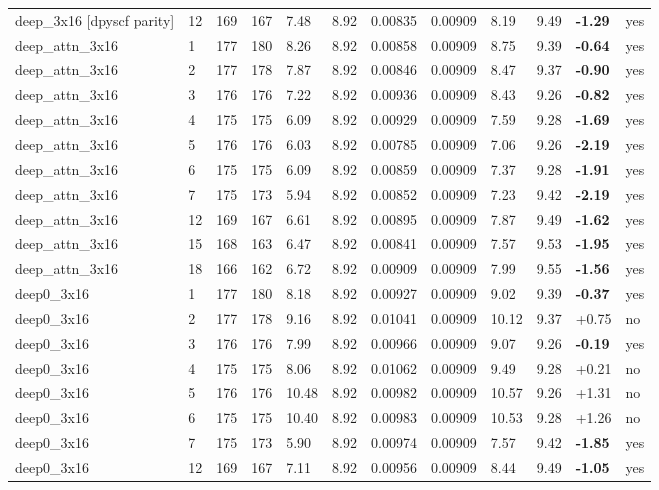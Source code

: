 \documentclass[10pt,a4paper]{article}
\begin{document}
\begin{landscape}
\begin{scriptsize}
\begin{longtable}{llllllllllll}
deep\_3x16 [dpyscf parity] & 12 & 169 & 167 & 7.48 & 8.92 & 0.00835 & 0.00909 & 8.19 & 9.49 & \textbf{-1.29} & yes \\
deep\_attn\_3x16 & 1 & 177 & 180 & 8.26 & 8.92 & 0.00858 & 0.00909 & 8.75 & 9.39 & \textbf{-0.64} & yes \\
deep\_attn\_3x16 & 2 & 177 & 178 & 7.87 & 8.92 & 0.00846 & 0.00909 & 8.47 & 9.37 & \textbf{-0.90} & yes \\
deep\_attn\_3x16 & 3 & 176 & 176 & 7.22 & 8.92 & 0.00936 & 0.00909 & 8.43 & 9.26 & \textbf{-0.82} & yes \\
deep\_attn\_3x16 & 4 & 175 & 175 & 6.09 & 8.92 & 0.00929 & 0.00909 & 7.59 & 9.28 & \textbf{-1.69} & yes \\
deep\_attn\_3x16 & 5 & 176 & 176 & 6.03 & 8.92 & 0.00785 & 0.00909 & 7.06 & 9.26 & \textbf{-2.19} & yes \\
deep\_attn\_3x16 & 6 & 175 & 175 & 6.09 & 8.92 & 0.00859 & 0.00909 & 7.37 & 9.28 & \textbf{-1.91} & yes \\
deep\_attn\_3x16 & 7 & 175 & 173 & 5.94 & 8.92 & 0.00852 & 0.00909 & 7.23 & 9.42 & \textbf{-2.19} & yes \\
deep\_attn\_3x16 & 12 & 169 & 167 & 6.61 & 8.92 & 0.00895 & 0.00909 & 7.87 & 9.49 & \textbf{-1.62} & yes \\
deep\_attn\_3x16 & 15 & 168 & 163 & 6.47 & 8.92 & 0.00841 & 0.00909 & 7.57 & 9.53 & \textbf{-1.95} & yes \\
deep\_attn\_3x16 & 18 & 166 & 162 & 6.72 & 8.92 & 0.00909 & 0.00909 & 7.99 & 9.55 & \textbf{-1.56} & yes \\
deep0\_3x16 & 1 & 177 & 180 & 8.18 & 8.92 & 0.00927 & 0.00909 & 9.02 & 9.39 & \textbf{-0.37} & yes \\
deep0\_3x16 & 2 & 177 & 178 & 9.16 & 8.92 & 0.01041 & 0.00909 & 10.12 & 9.37 & +0.75 & no \\
deep0\_3x16 & 3 & 176 & 176 & 7.99 & 8.92 & 0.00966 & 0.00909 & 9.07 & 9.26 & \textbf{-0.19} & yes \\
deep0\_3x16 & 4 & 175 & 175 & 8.06 & 8.92 & 0.01062 & 0.00909 & 9.49 & 9.28 & +0.21 & no \\
deep0\_3x16 & 5 & 176 & 176 & 10.48 & 8.92 & 0.00982 & 0.00909 & 10.57 & 9.26 & +1.31 & no \\
deep0\_3x16 & 6 & 175 & 175 & 10.40 & 8.92 & 0.00983 & 0.00909 & 10.53 & 9.28 & +1.26 & no \\
deep0\_3x16 & 7 & 175 & 173 & 5.90 & 8.92 & 0.00974 & 0.00909 & 7.57 & 9.42 & \textbf{-1.85} & yes \\
deep0\_3x16 & 12 & 169 & 167 & 7.11 & 8.92 & 0.00956 & 0.00909 & 8.44 & 9.49 & \textbf{-1.05} & yes \\

\end{longtable}
\end{scriptsize}
\end{landscape}
\end{document}
